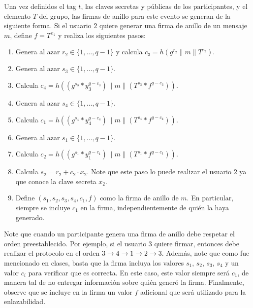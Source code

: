 Una vez definidos el tag $t$, las claves secretas y públicas de los participantes, y el elemento $T$ del grupo,
las firmas de anillo para este evento se generan de la siguiente forma.
Si el usuario $2$ quiere generar una firma de anillo de un mensaje $m$, define $f = T^{x_2}$ y realiza
los siguientes pasos:
\begin{enumerate}
\item Genera al azar $r_2 \in \{1, \ldots, q-1\}$ y calcula $c_3 = h(g^{r_2} \| m \| T^{r_2} )$.

\item Genera al azar $s_3 \in \{1, \ldots, q-1\}$.

\item Calcula $c_4 = h((g^{s_3} * y_3^{q - c_3}) \| m \| (T^{s_3} * f^{q - c_3}))$.

\item Genera al azar $s_4 \in \{1, \ldots, q-1\}$.

\item Calcula $c_1 = h((g^{s_4} * y_4^{q - c_4}) \| m \| (T^{s_4} * f^{q - c_4}))$.

\item Genera al azar $s_1 \in \{1, \ldots, q-1\}$.

\item Calcula $c_2 = h((g^{s_1} * y_1^{q - c_1}) \| m \| (T^{s_1} * f^{q - c_1}))$.

\item Calcula $s_2 = r_2 + c_2 \cdot x_2$. Note que este paso lo puede realizar el usuario $2$ ya que
conoce la clave secreta $x_2$.

\item Define $(s_1, s_2, s_3, s_4, c_1, f)$ como la firma de anillo de $m$. En particular, siempre se incluye $c_1$ en la
firma, independientemente de quién la haya generado.
\end{enumerate}
Note que cuando un participante genera una firma de anillo debe respetar el orden preestablecido. Por ejemplo, si el
usuario 3 quiere firmar, entonces debe realizar el protocolo en el orden $3 \to 4 \to 1 \to 2 \to 3$.
Además, note que como fue mencionado en clases, basta que la firma incluya los valores $s_1$, $s_2$, $s_3$, $s_4$
y un valor $c_i$ para verificar que es correcta. En este caso, este valor siempre será $c_1$, de manera tal de no
entregar información sobre quién generó la firma. Finalmente, observe que se incluye en la firma un valor $f$ adicional
que será utilizado para la enlazabilidad.

